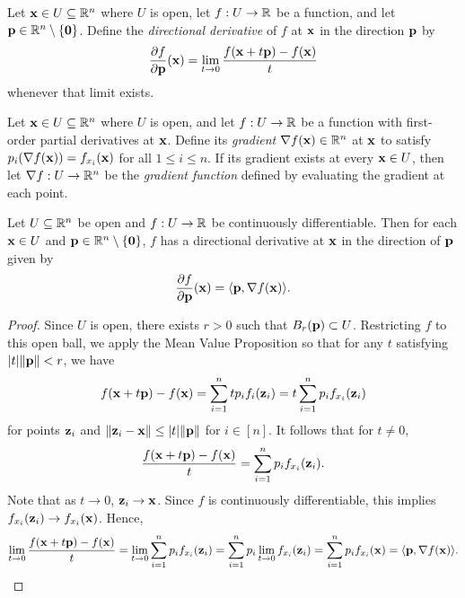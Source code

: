 \documentclass[letterpaper, twoside, 12pt]{book}
\begin{document}
\begin{definition}
  Let \(\mathbf x\in U\subseteq\mathbb R^n\) where \(U\) is open, let
  \(f:U\to\mathbb R\) be a function, and let
  \(\mathbf p\in\mathbb R^n\setminus\{\mathbf 0\}\). Define the
  \textit{directional derivative} of \(f\) at \(\mathbf x\) in the direction
  \(\mathbf p\) by
  \[
    \frac{\partial f}{\partial \mathbf p}(\mathbf x)
      =
    \lim_{t\to 0}\frac{f(\mathbf x+t\mathbf p)-f(\mathbf x)}{t}
  \]
  whenever that limit exists.
\end{definition}

\begin{definition}
  Let \(\mathbf x\in U\subseteq\mathbb R^n\) where \(U\) is open, and let
  \(f:U\to\mathbb R\) be a function with first-order partial derivatives
  at \(\mathbf x\). Define its \textit{gradient} \(\nabla f(\mathbf x)\in\mathbb R^n\)
  at \(\mathbf x\) to satisfy \(p_i(\nabla f(\mathbf x))=f_{x_i}(\mathbf x)\)
  for all \(1\leq i\leq n\).
  If its gradient exists at every \(\mathbf x\in U\), then let
  \(\nabla f:U\to\mathbb R^n\) be the \textit{gradient function}
  defined by evaluating the gradient at each point.
\end{definition}

\begin{theorem}
  Let \(U\subseteq\mathbb R^n\) be open and \(f:U\to\mathbb R\) be continuously
  differentiable. Then for each \(\mathbf x\in U\) and
  \(\mathbf p\in\mathbb R^n\setminus\{\mathbf 0\}\), \(f\) has a directional derivative
  at \(\mathbf x\) in the direction of \(\mathbf p\) given by
  \[
    \frac{\partial f}{\partial \mathbf p}(\mathbf x)
      =
    \langle\mathbf p,\nabla f(\mathbf x)\rangle
  .\]
\end{theorem}

\begin{proof}
    Since \(U\) is open, there exists \(r > 0\) such that
    \(B_{r}(\mathbf p) \subset U\). Restricting \(f\) to this open ball, 
    we apply the Mean Value Proposition so that for any \(t\) satisfying
    \(|t|\|\mathbf p\| < r\), we have
    \[ f(\mathbf x + t \mathbf p) - f(\mathbf x) = 
    \sum_{i = 1}^n t p_i f_i(\mathbf z_i) = t \sum_{i = 1}^n p_i f_{x_i}(\mathbf z_i) \]
    for points \(\mathbf z_i\) and \(\|\mathbf z_i - \mathbf x\| \leq |t|\|\mathbf p\|\)
    for \(i \in [n]\). It follows that for \(t \neq 0\),
    \[ \frac{ f(\mathbf x + t \mathbf p) - f(\mathbf x)}{t} = \sum_{i = 1}^n p_i f_{x_i}(\mathbf z_i) .\]
    Note that as \(t \to 0\), \(\mathbf z_i \to \mathbf x\). Since \(f\)
    is continuously differentiable, this implies \(f_{x_i}(\mathbf z_i) \to f_{x_i}(\mathbf x)\).
    Hence,
    \[ \lim_{t \to 0} \frac{f(\mathbf x + t \mathbf p) - f(\mathbf x)}{t} =
       \lim_{t \to 0} \sum_{i = 1}^n p_i f_{x_i}(\mathbf z_i) =
       \sum_{i = 1}^n p_i \lim_{t \to 0} f_{x_i}(\mathbf z_i) =
   \sum_{i = 1}^n p_i f_{x_i}(\mathbf x) = \langle \mathbf p, \nabla f(\mathbf x) \rangle .\]
\end{proof}
\end{document}
